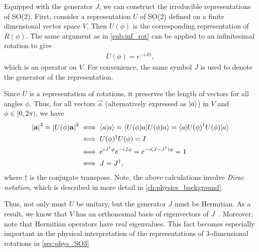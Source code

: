 Equipped with the generator $J$, we can construct the irreducible representations of SO(2). First, consider a representation $U$ of SO(2) defined on a finite dimensional vector space $V$. Then $U(\phi)$ is the corresponding representation of $R(\phi)$. The same argument as in \cref{sub:inf_rot} can be applied to an infinitesimal rotation to give
\begin{align}
    U(\phi) = e^{-iJ\phi},
\end{align}
which is an operator on $V$. For convenience, the same symbol $J$ is used to denote the generator of the representation.

Since $U$ is a representation of rotations, it preserves the length of vectors for all angles $\phi$. Thus, for all vectors $\vec{a}$ (alternatively expressed as $\ket{a}$) in $V$ and $\phi\in[0,2\pi)$, we have
\begin{align}
    \begin{split}        
    \left|\mathbf{a}\right|^2 = \left|U(\phi)\mathbf{a}\right|^2
    &\iff \braket{a|a} = \braket{U(\phi)a|U(\phi)a} = \braket{a|{U(\phi)}^\dagger U(\phi)|a} \\
    &\iff U(\phi)^\dagger U(\phi) = I \\
    &\iff e^{iJ^\dagger\phi}e^{-iJ\phi} = e^{-i(J-J^\dagger)\phi} = 1 \\
    &\iff J = J^\dagger,
    \end{split}
\end{align}
where $\dagger$ is the conjugate transpose. Note, the above calculations involve \textit{Dirac notation}, which is described in more detail in \cref{ch:physics_background}.

Thus, not only must $U$ be unitary, but the generator $J$ must be Hermitian. As a result, we know that $V$ has an orthonormal basis of eigenvectors of $J$~\cite{Axler2024}. Moreover, note that Hermitian operators have real eigenvalues. This fact becomes especially important in the physical interpretation of the representations of 3-dimensional rotations in \cref{sec:phys_SO3}

